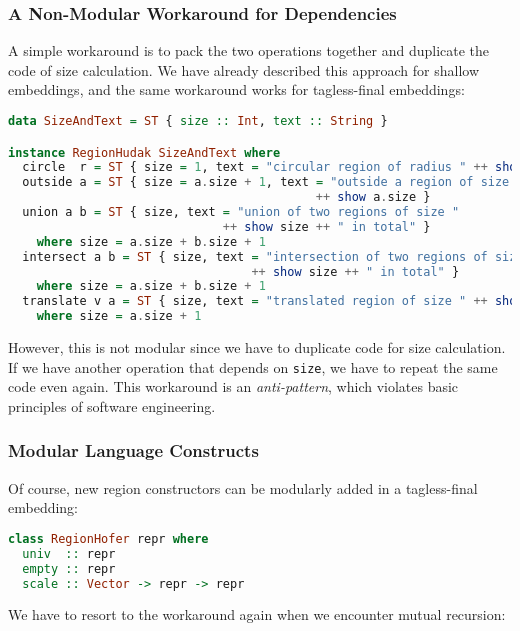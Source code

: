 \subsubsection{A Non-Modular Workaround for Dependencies}

A simple workaround is to pack the two operations together and duplicate
the code of size calculation. We have already described this approach
for shallow embeddings, and the same workaround works for tagless-final
embeddings:

\begin{lstlisting}[language=Haskell,deletekeywords={union,intersect}]
data SizeAndText = ST { size :: Int, text :: String }

instance RegionHudak SizeAndText where
  circle  r = ST { size = 1, text = "circular region of radius " ++ show r }
  outside a = ST { size = a.size + 1, text = "outside a region of size "
                                           ++ show a.size }
  union a b = ST { size, text = "union of two regions of size "
                              ++ show size ++ " in total" }
    where size = a.size + b.size + 1
  intersect a b = ST { size, text = "intersection of two regions of size "
                                  ++ show size ++ " in total" }
    where size = a.size + b.size + 1
  translate v a = ST { size, text = "translated region of size " ++ show size }
    where size = a.size + 1
\end{lstlisting}
\noindent
However, this is not modular since we have to duplicate code for size
calculation. If we have another operation that depends on
\lstinline!size!, we have to repeat the same code even
again. This workaround is an \emph{anti-pattern}, which violates
basic principles of software engineering.

\subsubsection{Modular Language Constructs}

Of course, new region constructors can be modularly added in a
tagless-final embedding:

\begin{lstlisting}[language=Haskell]
class RegionHofer repr where
  univ  :: repr
  empty :: repr
  scale :: Vector -> repr -> repr
\end{lstlisting}
\noindent
We have to resort to the workaround again when we encounter mutual
recursion:


